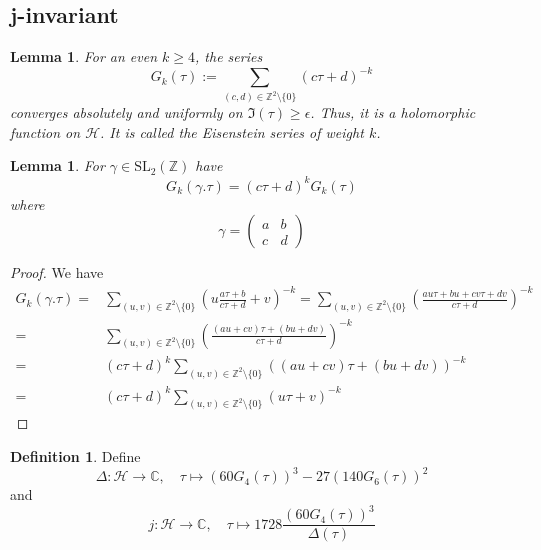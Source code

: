 \documentclass{scrartcl}
\newcommand{\Z}{\mathbb{Z}}
\newcommand{\C}{\mathbb{C}}
\newcommand{\Half}{\mathcal{H}}
\newcommand{\SL}{\mathrm{SL}}
\newtheorem{lemma}[prop]{Lemma}
\theoremstyle{definition}
\newtheorem{definition}[prop]{Definition}
\begin{document}
\subsection{j-invariant}
\begin{lemma}
    For an even $k \geq 4$, the series
    \begin{equation*}
        G_k(\tau) := \sum_{(c, d) \in \Z^2 \setminus \{0\}} (c\tau + d)^{-k}
    \end{equation*}
    converges absolutely and uniformly on $\Im(\tau) \geq \epsilon$.
    Thus, it is a holomorphic function on $\Half$.
    It is called the Eisenstein series of weight $k$.
\end{lemma}
\begin{lemma}
    For $\gamma \in \SL_2(\Z)$ have
    \begin{equation*}
        G_k(\gamma.\tau) = (c\tau + d)^k G_k(\tau)
    \end{equation*}
    where
    \begin{equation*}
        \gamma = \left(\begin{matrix}
            a & b \\ c & d
        \end{matrix}\right)
    \end{equation*}
\end{lemma}
\begin{proof}
    We have
    \begin{align*}
        G_k(\gamma.\tau) =& \sum_{(u, v) \in \Z^2 \setminus \{0\}} \left( u\frac {a\tau + b} {c \tau + d} + v \right)^{-k} = \sum_{(u, v) \in \Z^2 \setminus \{0\}} \left( \frac {au\tau + bu + cv\tau + dv} {c\tau + d} \right)^{-k} \\
        =& \sum_{(u, v) \in \Z^2 \setminus \{0\}} \left( \frac {(au + cv) \tau + (bu + dv)} {c\tau + d} \right)^{-k} \\
        =& (c\tau + d)^k \sum_{(u, v) \in \Z^2 \setminus \{0\}} ((au + cv)\tau + (bu + dv))^{-k} \\
        =& (c\tau + d)^k \sum_{(u, v) \in \Z^2 \setminus \{0\}} (u\tau + v)^{-k}
    \end{align*}
\end{proof}
\begin{definition}
    Define
    \begin{equation*}
        \Delta: \Half \to \C, \quad \tau \mapsto (60 G_4(\tau))^3 - 27 (140 G_6(\tau))^2
    \end{equation*}
    and
    \begin{equation*}
        j: \Half \to \C, \quad \tau \mapsto 1728 \frac {(60G_4(\tau))^3} {\Delta(\tau)}
    \end{equation*}
\end{definition}
\end{document}
